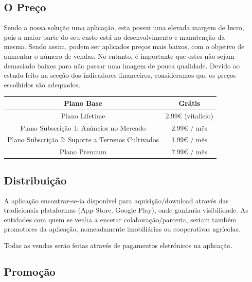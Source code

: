 \documentclass[11pt]{article}
\begin{document}
	\pagebreak
	
	\large
	\subsection{O Preço}
	
	\normalsize
	
	Sendo a nossa solução uma aplicação, esta possui uma elevada margem de lucro, pois a maior parte do seu custo está no desenvolvimento e manutenção da mesma. Sendo assim, podem ser aplicados preços mais baixos, com o objetivo de aumentar o número de vendas. No entanto, é importante que estes não sejam demasiado baixos para não passar uma imagem de pouca qualidade. Devido ao estudo feito na secção dos indicadores financeiros, consideramos que os preços escolhidos são adequados.
	
	\begin{center}
		\begin{tabular}{ | c | c | }
			\hline
			Plano Base & Grátis \\
			\hline
			Plano Lifetime & 2.99€ (vitalício) \\
			\hline
			Plano Subscrição 1: Anúncios no Mercado & 2.99€ / mês \\
			\hline 
			Plano Subscrição 2: Suporte a Terrenos Cultivados & 1.99€ / mês \\
			\hline   
			Plano Premium & 7.99€ / mês \\
			\hline
		\end{tabular}
	\end{center}
	
	
	\large
	\subsection{Distribuição}
	
	\normalsize
	
	A aplicação encontrar-se-ia disponível para aquisição/download através das tradicionais plataformas (App Store, Google Play), onde ganharia visibilidade. As entidades com quem se venha a encetar colaboração/parceria, seriam também promotores da aplicação, nomeadamente imobiliárias ou cooperativas agrícolas.
	
	Todas as vendas serão feitas através de pagamentos eletrónicos na aplicação.
	
	
	\large
	\subsection{Promoção}
	
\end{document}
